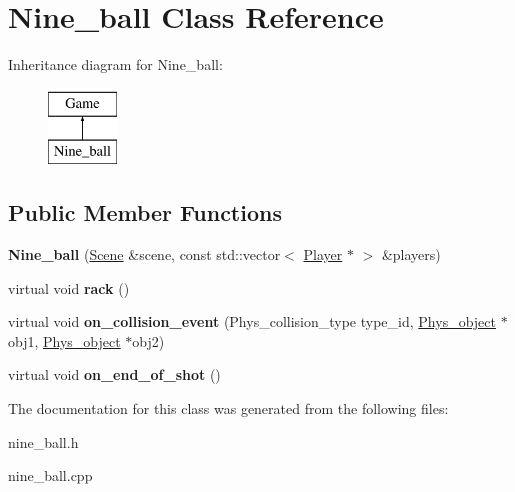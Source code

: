 \hypertarget{class_nine__ball}{
\section{Nine\_\-ball Class Reference}
\label{class_nine__ball}
}
Inheritance diagram for Nine\_\-ball:\begin{figure}[H]
\begin{center}
\leavevmode
\includegraphics[height=2.000000cm]{class_nine__ball}
\end{center}
\end{figure}
\subsection*{Public Member Functions}
\begin{DoxyCompactItemize}
\item 
\hypertarget{class_nine__ball_a2abc196e2b2c143bdf78a67ae5b3cef3}{
{\bfseries Nine\_\-ball} (\hyperlink{class_scene}{Scene} \&scene, const std::vector$<$ \hyperlink{class_player}{Player} $\ast$ $>$ \&players)}
\label{class_nine__ball_a2abc196e2b2c143bdf78a67ae5b3cef3}

\item 
\hypertarget{class_nine__ball_a93a9b3ba61900082f6dfb201efa63884}{
virtual void {\bfseries rack} ()}
\label{class_nine__ball_a93a9b3ba61900082f6dfb201efa63884}

\item 
\hypertarget{class_nine__ball_a26d50bbf4beffb6611d1404b50b1e210}{
virtual void {\bfseries on\_\-collision\_\-event} (Phys\_\-collision\_\-type type\_\-id, \hyperlink{class_phys__object}{Phys\_\-object} $\ast$obj1, \hyperlink{class_phys__object}{Phys\_\-object} $\ast$obj2)}
\label{class_nine__ball_a26d50bbf4beffb6611d1404b50b1e210}

\item 
\hypertarget{class_nine__ball_a7a8ec07d1ab60e00f86c6a8fb1c57757}{
virtual void {\bfseries on\_\-end\_\-of\_\-shot} ()}
\label{class_nine__ball_a7a8ec07d1ab60e00f86c6a8fb1c57757}

\end{DoxyCompactItemize}


The documentation for this class was generated from the following files:\begin{DoxyCompactItemize}
\item 
nine\_\-ball.h\item 
nine\_\-ball.cpp\end{DoxyCompactItemize}
